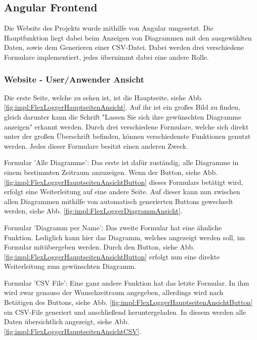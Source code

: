 \subsection{Angular Frontend}
Die Website des Projekts wurde mithilfe von Angular umgesetzt. Die Hauptfunktion liegt dabei beim Anzeigen von Diagrammen mit den ausgewählten Daten, sowie dem Generieren einer CSV-Datei. Dabei werden drei verschiedene Formulare implementiert, jedes übernimmt dabei eine andere Rolle.




\subsubsection{Website - User/Anwender Ansicht}
Die erste Seite, welche zu sehen ist, ist die Hauptseite, siehe Abb. \ref{fig:impl:FlexLoggerHauptseitenAnsicht}. Auf ihr ist ein großes Bild zu finden, gleich darunter kann die Schrift "Lassen Sie sich ihre gewünschten Diagramme anzeigen" erkannt werden.
Durch drei verschiedene Formulare, welche sich direkt unter der großen Überschrift befinden, können verschiedenste Funktionen genutzt werden. Jedes dieser Formulare besitzt einen anderen Zweck.


\begin{compactitem}
\item Formular 'Alle Diagramme': Das erste ist dafür zuständig, alle Diagramme in einem bestimmten Zeitraum anzuzeigen. Wenn der Button, siehe Abb. \ref{fig:impl:FlexLoggerHauptseitenAnsichtButton} dieses Formulars betätigt wird, erfolgt eine Weiterleitung auf eine andere Seite. Auf dieser kann nun zwischen allen Diagrammen mithilfe von automatisch generierten Buttons gewechselt werden, siehe Abb. \ref{fig:impl:FlexLoggerDiagrammAnsicht}.
\item Formular 'Diagramm per Name': Das zweite Formular hat eine ähnliche Funktion. Lediglich kann hier das Diagramm, welches angezeigt werden soll, im Formular mitübergeben werden. Durch den Button, siehe Abb. \ref{fig:impl:FlexLoggerHauptseitenAnsichtButton} erfolgt nun eine direkte Weiterleitung zum gewünschten Diagramm.
\item Formular 'CSV File': Eine ganz andere Funktion hat das letzte Formular. In ihm wird zwar genauso der Wunschzeitraum angegeben, allerdings wird nach Betätigen des Buttons, siehe Abb. \ref{fig:impl:FlexLoggerHauptseitenAnsichtButton} ein CSV-File generiert und anschließend heruntergeladen. In diesem werden alle Daten übersichtlich angezeigt, siehe Abb. \ref{fig:impl:FlexLoggerHauptseitenAnsichtCSV}.
\end{compactitem}


